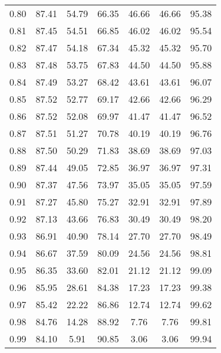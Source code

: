 \begin{tabular}{|c|c|c|c|c|c|c|}
      0.80 &     87.41 &     54.79 &      66.35 &   46.66 &      46.66 &         95.38 \\
      0.81 &     87.45 &     54.51 &      66.85 &   46.02 &      46.02 &         95.54 \\
      0.82 &     87.47 &     54.18 &      67.34 &   45.32 &      45.32 &         95.70 \\
      0.83 &     87.48 &     53.75 &      67.83 &   44.50 &      44.50 &         95.88 \\
      0.84 &     87.49 &     53.27 &      68.42 &   43.61 &      43.61 &         96.07 \\
      0.85 &     87.52 &     52.77 &      69.17 &   42.66 &      42.66 &         96.29 \\
      0.86 &     87.52 &     52.08 &      69.97 &   41.47 &      41.47 &         96.52 \\
      0.87 &     87.51 &     51.27 &      70.78 &   40.19 &      40.19 &         96.76 \\
      0.88 &     87.50 &     50.29 &      71.83 &   38.69 &      38.69 &         97.03 \\
      0.89 &     87.44 &     49.05 &      72.85 &   36.97 &      36.97 &         97.31 \\
      0.90 &     87.37 &     47.56 &      73.97 &   35.05 &      35.05 &         97.59 \\
      0.91 &     87.27 &     45.80 &      75.27 &   32.91 &      32.91 &         97.89 \\
      0.92 &     87.13 &     43.66 &      76.83 &   30.49 &      30.49 &         98.20 \\
      0.93 &     86.91 &     40.90 &      78.14 &   27.70 &      27.70 &         98.49 \\
      0.94 &     86.67 &     37.59 &      80.09 &   24.56 &      24.56 &         98.81 \\
      0.95 &     86.35 &     33.60 &      82.01 &   21.12 &      21.12 &         99.09 \\
      0.96 &     85.95 &     28.61 &      84.38 &   17.23 &      17.23 &         99.38 \\
      0.97 &     85.42 &     22.22 &      86.86 &   12.74 &      12.74 &         99.62 \\
      0.98 &     84.76 &     14.28 &      88.92 &    7.76 &       7.76 &         99.81 \\
      0.99 &     84.10 &      5.91 &      90.85 &    3.06 &       3.06 &         99.94 \\
\bottomrule
\end{tabular}

